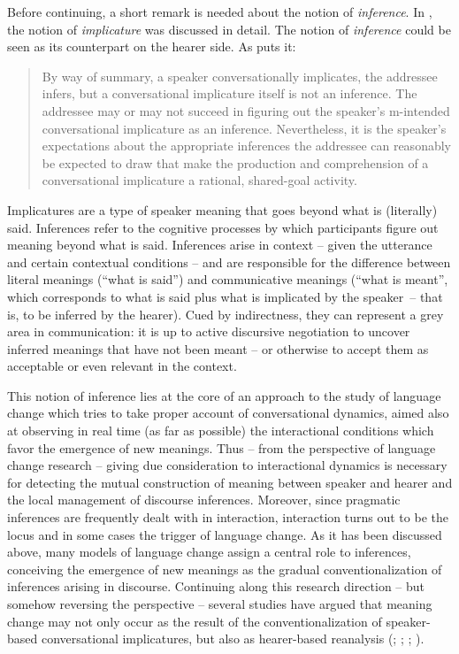 Before continuing, a short remark is needed about the notion of \textit{inference}. In , the notion of \textit{implicature} was discussed in detail. The notion of \textit{inference} could be seen as its counterpart on the hearer side. As \citet{Huang2017} puts it:

\begin{quote}
By way of summary, a speaker conversationally implicates, the addressee infers, but a conversational implicature itself is not an inference. The addressee may or may not succeed in figuring out the speaker’s m-intended conversational implicature as an inference. Nevertheless, it is the speaker’s expectations about the appropriate inferences the addressee can reasonably be expected to draw that make the production and comprehension of a conversational implicature a rational, shared-goal activity. \citep[157]{Huang2017}
\end{quote}

Implicatures are a type of speaker meaning that goes beyond what is (literally) said. Inferences refer to the cognitive processes by which participants figure out meaning beyond what is said. Inferences arise in context – given the utterance and certain contextual conditions – and are responsible for the difference between literal meanings (“what is said”) and communicative meanings (“what is meant”, which corresponds to what is said plus what is implicated by the speaker~– that is, to be inferred by the hearer). Cued by indirectness, they can represent a grey area in communication: it is up to active discursive negotiation to uncover inferred meanings that have not been meant – or otherwise to accept them as acceptable or even relevant in the context.

This notion of inference lies at the core of an approach to the study of language change which tries to take proper account of conversational dynamics, aimed also at observing in real time (as far as possible) the interactional conditions which favor the emergence of new meanings. Thus – from the perspective of language change research – giving due consideration to interactional dynamics is necessary for detecting the mutual construction of meaning between speaker and hearer and the local management of discourse inferences. Moreover, since pragmatic inferences are frequently dealt with in interaction, interaction turns out to be the locus and in some cases the trigger of language change. As it has been discussed above, many models of language change assign a central role to inferences, conceiving the emergence of new meanings as the gradual conventionalization of inferences arising in discourse. Continuing along this research direction – but somehow reversing the perspective – several studies have argued that meaning change may not only occur as the result of the conventionalization of speaker-based conversational implicatures, but also as hearer-based reanalysis (\citealt{DetgesWaltereit2002}; \citealt{Eckardt2009}; \citealt{SchwenterWaltereit2010}; \citealt{RosemeyerGrossman2018}).

